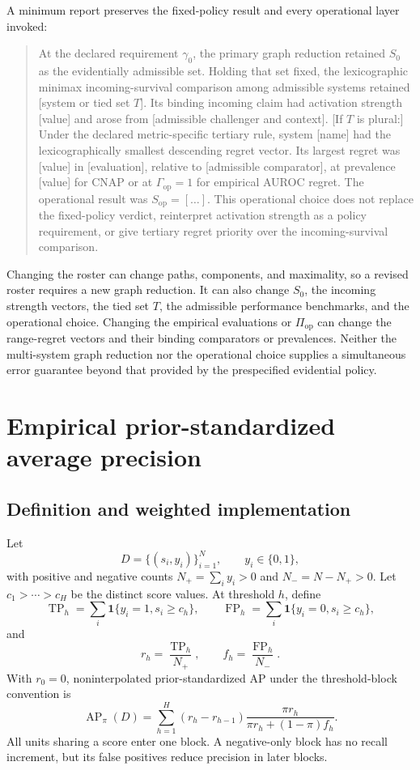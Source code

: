 \documentclass[11pt]{article}
\newcommand{\AP}{\operatorname{AP}}
\theoremstyle{remark}
\begin{document}
A minimum report preserves the fixed-policy result and every operational layer
invoked:
\begin{quote}
At the declared requirement $\gamma_0$, the primary graph reduction retained
$S_0$ as the evidentially admissible set. Holding that set fixed, the
lexicographic minimax incoming-survival comparison among admissible systems
retained [system or tied set $T$]. Its binding incoming claim had activation
strength [value] and arose from [admissible challenger and context]. [If $T$ is
plural:] Under the declared metric-specific tertiary rule,
system [name] had the lexicographically smallest descending regret
vector. Its largest regret was [value] in [evaluation], relative to
[admissible comparator], at prevalence [value] for CNAP or at
$\Gamma_{\mathrm{op}}=1$ for empirical AUROC regret. The operational result was
$S_{\mathrm{op}}=[\ldots]$. This operational choice does not replace the
fixed-policy verdict, reinterpret activation strength as a policy requirement,
or give tertiary regret priority over the incoming-survival comparison.
\end{quote}

Changing the roster can change paths, components, and maximality, so a revised
roster requires a new graph reduction. It can also change $S_0$, the incoming
strength vectors, the tied set $T$, the admissible performance benchmarks, and
the operational choice. Changing the empirical evaluations or
$\Pi_{\mathrm{op}}$ can change the range-regret vectors and their binding
comparators or prevalences. Neither the multi-system graph reduction nor the
operational choice supplies a simultaneous error guarantee beyond that
provided by the prespecified evidential policy.

\section{Empirical prior-standardized average precision}
\label{app:ap}

\subsection{Definition and weighted implementation}

Let
\[
D=\{(s_i,y_i)\}_{i=1}^N,
\qquad y_i\in\{0,1\},
\]
with positive and negative counts $N_+=\sum_i y_i>0$ and
$N_-=N-N_+>0$. Let $c_1>\cdots>c_H$ be the distinct score values. At
threshold $h$, define
\[
\operatorname{TP}_h
=\sum_i\mathbf 1\{y_i=1,s_i\geq c_h\},
\qquad
\operatorname{FP}_h
=\sum_i\mathbf 1\{y_i=0,s_i\geq c_h\},
\]
and
\[
r_h=\frac{\operatorname{TP}_h}{N_+},
\qquad
f_h=\frac{\operatorname{FP}_h}{N_-}.
\]
With $r_0=0$, noninterpolated prior-standardized AP under the threshold-block
convention is
\begin{equation}
\AP_\pi(D)
=
\sum_{h=1}^H
(r_h-r_{h-1})
\frac{\pi r_h}{\pi r_h+(1-\pi)f_h}.
\label{eq:empirical-ap}
\end{equation}
All units sharing a score enter one block. A negative-only block has no recall
increment, but its false positives reduce precision in later blocks.
\end{document}
